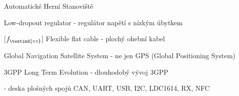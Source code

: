 \cleardoublepage
\chapter*{\listofabbrevname}
{}

\begin{acronym}[KolikMista]

		{Automatické Herní Stanoviště}

		{Low-dropout regulator - regulátor napětí s nízkým úbytkem}

		[\ensuremath{f_\textind{vz}}] %
		{Flexible flat cable - plochý ohební kabel}					%

		{Global Navigation Satellite System - ne jen GPS (Global Positioning System)}
	
		{3GPP Long Term Evolution - dlouhodobý vývoj 3GPP}

		{ - deska plošných spojů}    CAN, UART, USB, I2C, LDC1614, RX, NFC

\end{acronym}
